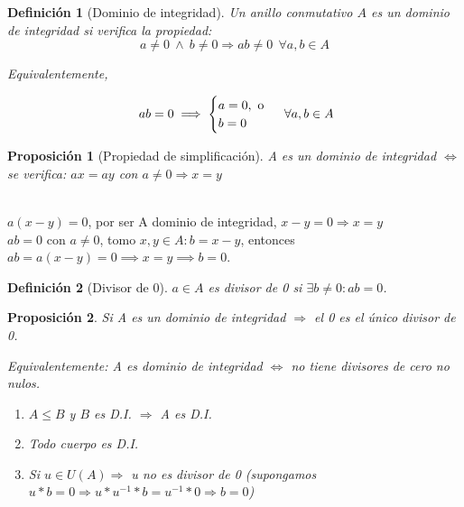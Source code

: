 \documentclass[11pt, a4paper, titlepage]{article}
\makeatletter
\renewenvironment{proof}[1][\proofname] {\vspace{-15pt}\par\pushQED{\qed}\normalfont\topsep6\p@\@plus6\p@\relax\trivlist\item[\hskip\labelsep\it#1\@addpunct{.}]\ignorespaces}{\popQED\endtrivlist\@endpefalse}
\theoremstyle{theorem-style}
\newtheorem*{nprop}{Proposición}
\theoremstyle{definition-style}
\newtheorem*{ndef}{Definición}
\theoremstyle{remark-style}
\theoremstyle{example-style}
\newenvironment{nlist}
{\begin{enumerate}
\renewcommand\labelenumi{(\emph{\roman{enumi})}}}
{\end{enumerate}}
\makeatother
\begin{document}
\begin{ndef}[Dominio de integridad]
Un anillo conmutativo $A$ es un dominio de integridad si verifica la propiedad:
\[
a \neq 0\ \wedge\ b \neq 0 \Rightarrow ab \neq 0 \ \ \forall a,b \in A
\] 

Equivalentemente,

\[ \hspace{0.1cm} ab=0 \implies \begin{cases}
	a = 0,\text{ o}\\
	b = 0
\end{cases} \ \forall a,b \in A
\]
	
\end{ndef}

\begin{nprop}[Propiedad de simplificación]
	
A es un dominio de integridad $\iff$ se verifica: $ax=ay$ con $a\neq 0 \Rightarrow x = y$
\end{nprop}
\begin{proof}\hfill\\
	\boxed{\Rightarrow} $a(x-y) = 0$, por ser A dominio de integridad, $x-y = 0 \Rightarrow x=y$ \\
	\boxed{\Leftarrow} $ab = 0$ con $a\neq 0$, tomo $x,y \in A : b = x-y$, entonces $ab = a(x-y) = 0 \implies x=y \implies b = 0$. 
\end{proof}

\begin{ndef}[Divisor de 0]
	$a\in A$ es divisor de 0 si $\exists b\neq 0 : ab = 0$.
\end{ndef}

\begin{nprop}
	Si A es un dominio de integridad $\Rightarrow$ el 0 es el único divisor de 0.
	
	Equivalentemente: A es dominio de integridad $\iff$ no tiene divisores de cero no nulos.
\begin{nlist}
	\item $A\leq B$ y $B$ es D.I. $\Rightarrow$ A es D.I.
	\item Todo cuerpo es D.I.
	\item Si $u \in U(A) \Rightarrow$ u no es divisor de 0 (supongamos $u*b = 0 \Rightarrow u*u^{-1}*b = u^{-1}*0 \Rightarrow b=0$)
\end{nlist}
\end{nprop}
\end{document}
